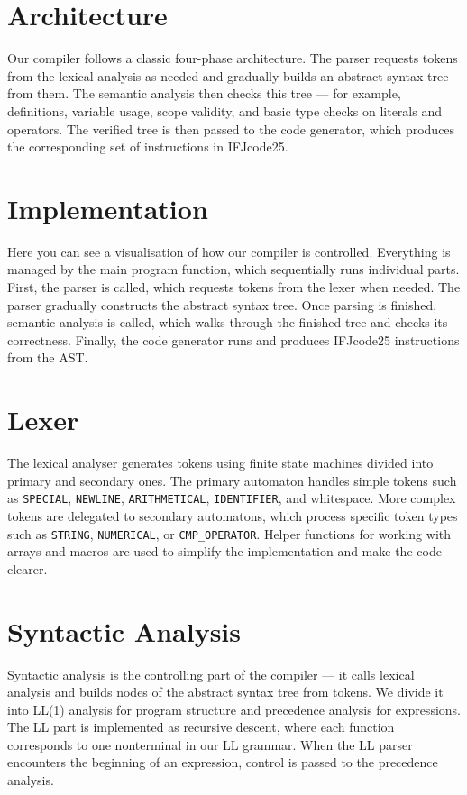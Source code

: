 \documentclass{article}
\begin{document}
\section{Architecture}
Our compiler follows a classic four-phase architecture. The parser requests tokens from the lexical analysis as needed and gradually builds an abstract syntax tree from them. The semantic analysis then checks this tree — for example, definitions, variable usage, scope validity, and basic type checks on literals and operators. The verified tree is then passed to the code generator, which produces the corresponding set of instructions in IFJcode25.

\section{Implementation}
Here you can see a visualisation of how our compiler is controlled. Everything is managed by the main program function, which sequentially runs individual parts. First, the parser is called, which requests tokens from the lexer when needed. The parser gradually constructs the abstract syntax tree. Once parsing is finished, semantic analysis is called, which walks through the finished tree and checks its correctness. Finally, the code generator runs and produces IFJcode25 instructions from the AST.

\section{Lexer}
The lexical analyser generates tokens using finite state machines divided into primary and secondary ones.  
The primary automaton handles simple tokens such as \texttt{SPECIAL}, \texttt{NEWLINE}, \texttt{ARITHMETICAL}, \texttt{IDENTIFIER}, and whitespace.  
More complex tokens are delegated to secondary automatons, which process specific token types such as \texttt{STRING}, \texttt{NUMERICAL}, or \texttt{CMP\_OPERATOR}.  
Helper functions for working with arrays and macros are used to simplify the implementation and make the code clearer.

\section{Syntactic Analysis}
Syntactic analysis is the controlling part of the compiler — it calls lexical analysis and builds nodes of the abstract syntax tree from tokens.  
We divide it into LL(1) analysis for program structure and precedence analysis for expressions.  
The LL part is implemented as recursive descent, where each function corresponds to one nonterminal in our LL grammar.  
When the LL parser encounters the beginning of an expression, control is passed to the precedence analysis.
\end{document}
